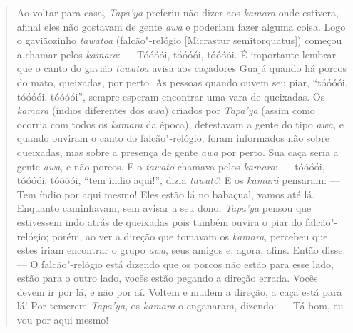 \begin{quote}
Ao voltar para casa, \emph{Tapa'ya} preferiu não dizer aos \emph{kamara}
onde estivera, afinal eles não gostavam de gente \emph{awa} e poderiam
fazer alguma coisa. Logo o gaviãozinho \emph{tawatoa} (falcão"-relógio
{[}Micrastur semitorquatus{]}) começou a chamar pelos \emph{kamara}:
--- Tóóóói, tóóóói, tóóóói. É importante lembrar que o canto do gavião
\emph{tawatoa} avisa aos caçadores Guajá quando há porcos do mato,
queixadas, por perto. As pessoas quando ouvem seu piar, ``tóóóói,
tóóóói, tóóóói'', sempre esperam encontrar uma vara de queixadas. Os
\emph{kamara} (índios diferentes dos \emph{awa}) criados por
\emph{Tapa'ya} (assim como ocorria com todos os \emph{kamara} da época),
detestavam a gente do tipo \emph{awa}, e quando ouviram o canto do
falcão"-relógio, foram informados não sobre queixadas, mas sobre a
presença de gente \emph{awa} por perto. Sua caça seria a gente
\emph{awa}, e não porcos. E o \emph{tawato} chamava pelos \emph{kamara}:
--- tóóóói, tóóóói, tóóóói, ``tem índio aqui!'', dizia \emph{tawató}! E os
\emph{kamará} pensaram: --- Tem índio por aqui mesmo! Eles estão lá no
babaçual, vamos até lá. Enquanto caminhavam, sem avisar a seu dono,
\emph{Tapa'ya} pensou que estivessem indo atrás de queixadas pois também
ouvira o piar do falcão"-relógio; porém, ao ver a direção que tomavam os
\emph{kamara}, percebeu que estes iriam encontrar o grupo \emph{awa},
seus amigos e, agora, afins. Então disse: --- O falcão"-relógio está dizendo
que os porcos não estão para esse lado, estão para o outro lado, vocês
estão pegando a direção errada. Vocês devem ir por lá, e não por aí.
Voltem e mudem a direção, a caça está para lá! Por temerem
\emph{Tapa'ya}, os \emph{kamara} o enganaram, dizendo: --- Tá bom, eu vou
por aqui mesmo!


\end{quote}
